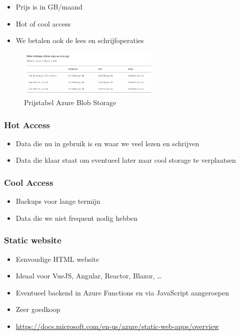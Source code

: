 \documentclass{article}
\begin{document}
\begin{itemize}
    \item Prijs is in GB/maand
    \item Hot of cool access
    \item We betalen ook de lees en schrijfoperaties
\end{itemize}

\begin{figure}[H]
    \centering
    \includegraphics[width=0.6\textwidth]{azure-storage-blob-pricing.png}
    \caption{Prijstabel Azure Blob Storage}
\end{figure}

\subsubsection{Hot Access}

\begin{itemize}
    \item Data die nu in gebruik is en waar we veel lezen en schrijven
    \item Data die klaar staat om eventueel later naar cool storage te verplaatsen
\end{itemize}

\subsubsection{Cool Access}

\begin{itemize}
    \item Backups voor lange termijn
    \item Data die we niet frequent nodig hebben
\end{itemize}

\subsubsection{Static website}

\begin{itemize}
    \item Eenvoudige HTML website
    \item Ideaal voor VueJS, Angular, Reactor, Blazor, \dots
    \item Eventueel backend in Azure Functions en via JavaScript aangeroepen
    \item Zeer goedkoop
    \item \url{https://docs.microsoft.com/en-us/azure/static-web-apps/overview}
\end{itemize}
\end{document}
